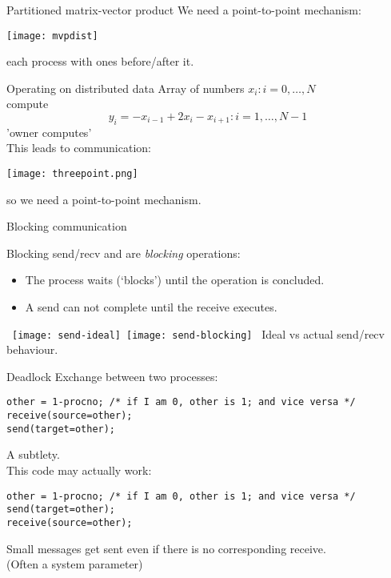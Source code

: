 \begin{numberedframe}{Partitioned matrix-vector product}
  We need a point-to-point mechanism:
  
  \texttt{[image: mvpdist]}

  each process with ones before/after it.
\end{numberedframe}

\begin{numberedframe}{Operating on distributed data}
Array of numbers $x_i\colon i=0,\ldots,N$\\
compute \[ y_i= -x_{i-1}+2x_i-x_{i+1} \colon i=1,\ldots,N-1 \]
'owner computes'\\
This leads to communication:

\texttt{[image: threepoint.png]}

so we need a point-to-point mechanism.
\end{numberedframe}

 {Blocking communication}

\begin{numberedframe}{Blocking send/recv}
 and  are \emph{blocking} operations:
\begin{itemize}
\item The process waits (`blocks') until the operation is concluded.
\item A send can not complete until the receive executes.
\end{itemize}
\hbox{
\texttt{[image: send-ideal]}
\texttt{[image: send-blocking]}
}
Ideal vs actual send/recv behaviour.
\end{numberedframe}

\begin{numberedframe}{Deadlock}
\lstset{language=C}
Exchange between two processes:
\begin{lstlisting}
other = 1-procno; /* if I am 0, other is 1; and vice versa */
receive(source=other);
send(target=other);
\end{lstlisting}

A subtlety.\\
This code may actually work:
\begin{lstlisting}
other = 1-procno; /* if I am 0, other is 1; and vice versa */
send(target=other);
receive(source=other);
\end{lstlisting}
Small messages get sent even if there is no corresponding receive.\\
(Often a system parameter)
\end{numberedframe}

